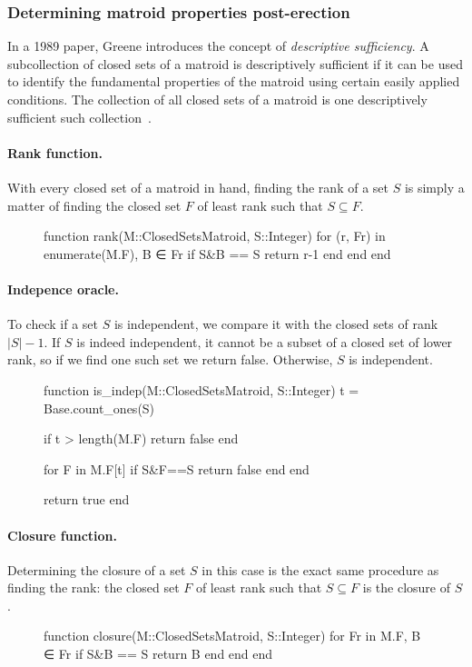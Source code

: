\subsubsection{Determining matroid properties post-erection}
In a 1989 paper, Greene introduces the concept of \textit{descriptive sufficiency}. A subcollection of closed sets of a matroid is descriptively sufficient if it can be used to identify the fundamental properties of the matroid using certain easily applied conditions. The collection of all closed sets of a matroid is one descriptively sufficient such collection~\cite{greene-1991}. 

\paragraph{Rank function.} With every closed set of a matroid in hand, finding the rank of a set $S$ is simply a matter of finding the closed set $F$ of least rank such that $S\subseteq F$.

\begin{figure}[ht!]
\begin{jllisting}
function rank(M::ClosedSetsMatroid, S::Integer)
  for (r, Fr) in enumerate(M.F), B ∈ Fr
      if S&B == S return r-1 end
  end
end
\end{jllisting}
\end{figure}

\paragraph{Indepence oracle.} To check if a set $S$ is independent, we compare it with the closed sets of rank $|S|-1$. If $S$ is indeed independent, it cannot be a subset of a closed set of lower rank, so if we find one such set we return false. Otherwise, $S$ is independent.

\begin{figure}[ht!]
\begin{jllisting}
function is_indep(M::ClosedSetsMatroid, S::Integer)
  t = Base.count_ones(S)

  if t > length(M.F) return false end

  for F in M.F[t]
    if S&F==S return false end
  end

  return true
end
\end{jllisting}
\end{figure}

\paragraph{Closure function.} Determining the closure of a set $S$ in this case is the exact same procedure as finding the rank: the closed set $F$ of least rank such that $S\subseteq F$ is the closure of $S$.
\begin{figure}[ht!]
\begin{jllisting}
function closure(M::ClosedSetsMatroid, S::Integer)
  for Fr in M.F, B ∈ Fr
      if S&B == S return B end
  end
end
\end{jllisting}
\end{figure}

